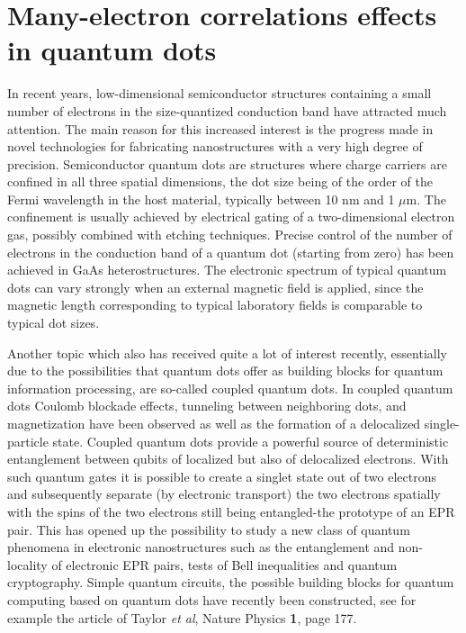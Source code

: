\newcommand{\OP}[1]{{\bf\widehat{#1}}}

\newcommand{\be}{\begin{equation}}

\newcommand{\ee}{\end{equation}}
\newcommand{\bra}[1]{\left\langle #1 \right|}
\newcommand{\ket}[1]{\left| #1 \right\rangle}
\newcommand{\braket}[2]{\left\langle #1 \right| #2 \right\rangle}




\pagestyle{plain}

\section*{Many-electron correlations effects in quantum dots}

In recent years, low-dimensional semiconductor structures containing a small number of electrons
in the size-quantized conduction band have attracted much attention. 
The main reason for this increased interest is the progress made in novel technologies for
fabricating nanostructures with a very high degree of precision. 
Semiconductor quantum dots are structures where
charge carriers are confined in all three spatial dimensions, 
the dot size being of the order of the Fermi wavelength 
in the host material, typically between  10 nm and  1 $\mu$m.
The confinement is usually achieved by electrical gating of a 
two-dimensional electron gas, 
possibly combined with etching techniques. Precise control of the
number of electrons in the conduction band of a quantum dot 
(starting from zero) has been achieved in GaAs heterostructures. 
The electronic spectrum of typical quantum dots
can vary strongly when an external magnetic field is applied, 
since the magnetic length corresponding to typical 
laboratory fields  is comparable to typical dot sizes.


Another topic which also has received quite a  lot of interest recently, essentially due to the 
possibilities that quantum dots offer as building blocks for quantum information processing, are so-called
coupled quantum dots. 
In coupled quantum dots Coulomb blockade effects, 
tunneling between neighboring dots, and magnetization 
have been observed as well as the formation of a
delocalized single-particle state. 
Coupled quantum dots  provide a powerful source of 
deterministic entanglement between qubits of localized 
but also of delocalized electrons. With such quantum gates it is
possible to create a singlet state out of two electrons 
and subsequently separate (by electronic transport) 
the two electrons spatially with the spins of the two electrons still being
entangled-the prototype of an EPR pair. 
This has opened  up the possibility to study a new class 
of quantum phenomena in electronic nanostructures 
such as the entanglement and
non-locality of electronic EPR pairs, tests of Bell inequalities and quantum cryptography.
Simple quantum circuits, the possible building blocks
for quantum computing based on quantum dots have recently been constructed, see for example
the article of Taylor {\em et al}, Nature Physics {\bf 1}, page 177.



